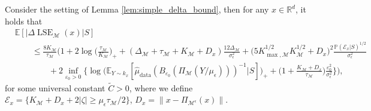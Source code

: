 \documentclass[10pt,a4paper]{amsart}
\newcommand{\E}{\mathbb{E}}
\newcommand{\M}{{\mathcal{M}}}
\newcommand{\Pieps}{\Pi_{\M^\epsilon}}
\newcommand{\R}{\mathbb{R}}
\newcommand{\gap}{\Delta_\M}
\newcommand{\lse}{\operatorname{LSE}}
\newcommand{\prob}{\mathbb{P}}
\begin{document}
\begin{lemma}\label{lem:tighter_delta_bound}
Consider the setting of Lemma \ref{lem:simple_delta_bound}, then for any \(x \in \R^d\), it holds that
\begin{align*}
    &\E[|\Delta \lse_\M(x)|S]\\
    & \qquad \leq \frac{8 K_\M}{\tau_\M} \bigg ( 1 + 2\log \big ( \tfrac{\tau_\M}{K_\M} \big )_+ + (\gap + \tau_\M + K_\M + D_x ) \frac{12\gap}{\sigma_\epsilon^2} + \Big ( 5 K_{\max, \M}^{1/2} K_\M^{1/2} + D_x \Big )^2 \frac{\prob(\mathcal{E}_x|S)^{1/2}}{\sigma_\epsilon^2}\\
    & \qquad \qquad + 2\inf_{\varepsilon_0 > 0} \bigg \{ \log \Big ( \E_{Y \sim k_x} [ \hat{\mu}_{\operatorname{data}}(B_{\varepsilon_0}(\Pi_\M(Y/\mu_\epsilon)))^{-1} | S ] \Big )_+ + \Big ( 1 + \tfrac{K_\M + D_x}{\tau_\M} \Big ) \frac{\varepsilon_0^2}{\sigma_\epsilon^2} \bigg \} \bigg ),
\end{align*}
for some universal constant \(\tilde{C} > 0\), where we define \(\mathcal{E}_x = \{ K_\M + D_x + 2 |\zeta| \geq \mu_\epsilon \tau_\M / 2 \}\), \(D_x = \|x - \Pieps(x)\|\).
\end{lemma}
\end{document}
